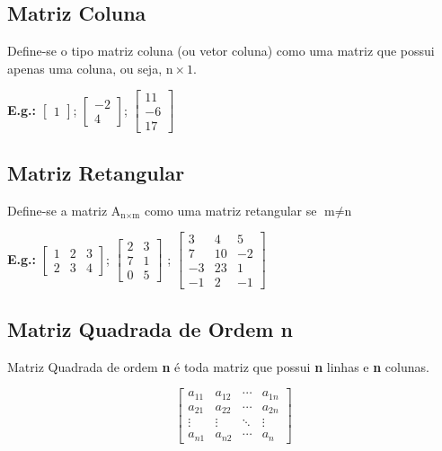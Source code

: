 \documentclass[a4paper,12pt]{article}
\begin{document}
\subsection{Matriz Coluna}

Define-se o tipo matriz coluna (ou vetor coluna) como uma matriz que possui apenas uma coluna, ou seja, $ \text{n} \times 1 $.

\textbf{E.g.:} $ \begin{bmatrix}
1\end{bmatrix} $; $ \begin{bmatrix}
-2 \\
4
\end{bmatrix}$; $ \begin{bmatrix}
11 \\ -6 \\ 17
\end{bmatrix}$

\subsection{Matriz Retangular}

Define-se a matriz $ \text{A}_{\text{n} \times \text{m} } $ como uma matriz retangular se $ \text{m} \neq \text{n} $

\textbf{E.g.:} $ \begin{bmatrix}
1 & 2 & 3\\
2 & 3 & 4
\end{bmatrix} $; $ \begin{bmatrix}
2 & 3\\
7 & 1 \\
0 & 5
\end{bmatrix} $ ; $ \begin{bmatrix}
3 & 4 & 5\\
7 & 10 & -2\\
-3 & 23 & 1\\
-1 & 2 & -1
\end{bmatrix} $

\subsection{Matriz Quadrada de Ordem \textbf{n}}

Matriz Quadrada de ordem \textbf{n} é toda matriz que possui \textbf{n} linhas e \textbf{n} colunas.

  $$
 \begin{bmatrix}
 a_{11} & a_{12} & \cdots & a_{1n} \\
 a_{21} & a_{22} & \cdots & a_{2n} \\
 \vdots & \vdots & \ddots & \vdots \\
 a_{n1} & a_{n2} & \cdots & a_{n}
 \end{bmatrix} $$
\end{document}
